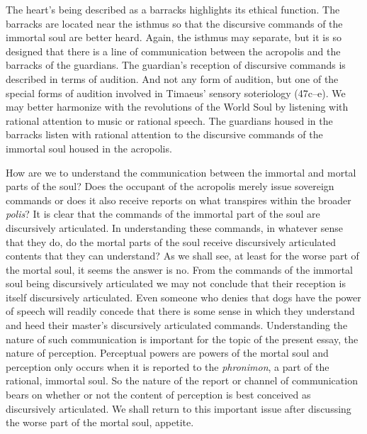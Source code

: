 The heart's being described as a barracks highlights its ethical function. The barracks are located near the isthmus so that the discursive commands of the immortal soul are better heard. Again, the isthmus may separate, but it is so designed that there is a line of communication between the acropolis and the barracks of the guardians. The guardian's reception of discursive commands is described in terms of audition. And not any form of audition, but one of the special forms of audition involved in Timaeus' sensory soteriology (47c--e). We may better harmonize with the revolutions of the World Soul by listening with rational attention to music or rational speech. The guardians housed in the barracks listen with rational attention to the discursive commands of the immortal soul housed in the acropolis.

How are we to understand the communication between the immortal and mortal parts of the soul? Does the occupant of the acropolis merely issue sovereign commands or does it also receive reports on what transpires within the broader \emph{polis}? It is clear that the commands of the immortal part of the soul are discursively articulated. In understanding these commands, in whatever sense that they do, do the mortal parts of the soul receive discursively articulated contents that they can understand? As we shall see, at least for the worse part of the mortal soul, it seems the answer is no. From the commands of the immortal soul being discursively articulated we may not conclude that their reception is itself discursively articulated. Even someone who denies that dogs have the power of speech will readily concede that there is some sense in which they understand and heed their master's discursively articulated commands. Understanding the nature of such communication is important for the topic of the present essay, the nature of perception. Perceptual powers are powers of the mortal soul and perception only occurs when it is reported to the \emph{phronimon}, a part of the rational, immortal soul. So the nature of the report or channel of communication bears on whether or not the content of perception is best conceived as discursively articulated. We shall return to this important issue after discussing the worse part of the mortal soul, appetite.


